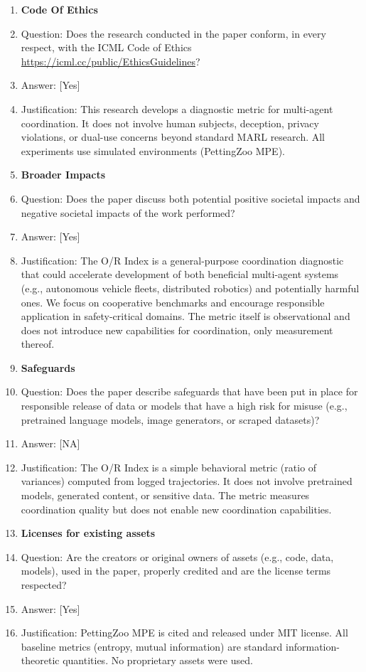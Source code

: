 \documentclass[twoside]{article}
\theoremstyle{remark}
\newcommand{\answerYes}{[Yes]}
\newcommand{\answerNA}{[NA]}
\begin{document}
\begin{enumerate}
\item {\bf Code Of Ethics}
    \item[] Question: Does the research conducted in the paper conform, in every respect, with the ICML Code of Ethics \url{https://icml.cc/public/EthicsGuidelines}?
    \item[] Answer: \answerYes{}
    \item[] Justification: This research develops a diagnostic metric for multi-agent coordination. It does not involve human subjects, deception, privacy violations, or dual-use concerns beyond standard MARL research. All experiments use simulated environments (PettingZoo MPE).

\item {\bf Broader Impacts}
    \item[] Question: Does the paper discuss both potential positive societal impacts and negative societal impacts of the work performed?
    \item[] Answer: \answerYes{}
    \item[] Justification: The O/R Index is a general-purpose coordination diagnostic that could accelerate development of both beneficial multi-agent systems (e.g., autonomous vehicle fleets, distributed robotics) and potentially harmful ones. We focus on cooperative benchmarks and encourage responsible application in safety-critical domains. The metric itself is observational and does not introduce new capabilities for coordination, only measurement thereof.

\item {\bf Safeguards}
    \item[] Question: Does the paper describe safeguards that have been put in place for responsible release of data or models that have a high risk for misuse (e.g., pretrained language models, image generators, or scraped datasets)?
    \item[] Answer: \answerNA{}
    \item[] Justification: The O/R Index is a simple behavioral metric (ratio of variances) computed from logged trajectories. It does not involve pretrained models, generated content, or sensitive data. The metric measures coordination quality but does not enable new coordination capabilities.

\item {\bf Licenses for existing assets}
    \item[] Question: Are the creators or original owners of assets (e.g., code, data, models), used in the paper, properly credited and are the license terms respected?
    \item[] Answer: \answerYes{}
    \item[] Justification: PettingZoo MPE is cited \citep{terry2021pettingzoo} and released under MIT license. All baseline metrics (entropy, mutual information) are standard information-theoretic quantities. No proprietary assets were used.


\end{enumerate}
\end{document}
